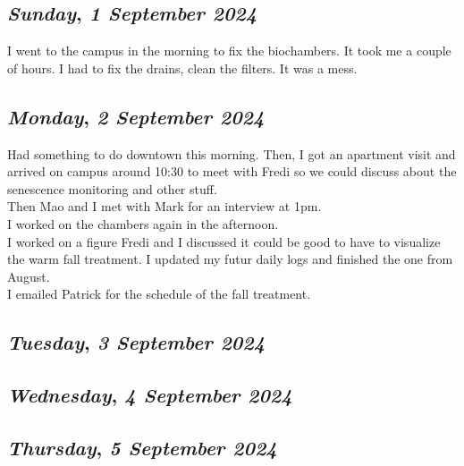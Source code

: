 \begin{center}
\section*{\month}
\end{center}

\def\day{\textit{1 September 2024}}
\def\weekday{\textit{Sunday}}
\subsection*{\weekday, \day}
I went to the campus in the morning to fix the biochambers. It took me a couple of hours. I had to fix the drains, clean the filters. It was a mess. 

\def\day{\textit{2 September 2024}}
\def\weekday{\textit{Monday}}
\subsection*{\weekday, \day}
Had something to do downtown this morning. Then, I got an apartment visit and arrived on campus around 10:30 to meet with Fredi so we could discuss about the senescence monitoring and other stuff. \\
Then Mao and I met with Mark for an interview at 1pm. \\
I worked on the chambers again in the afternoon.\\
I worked on a figure Fredi and I discussed it could be good to have to visualize the warm fall treatment. I updated my futur daily logs and finished the one from August. \\
I emailed Patrick for the schedule of the fall treatment. 

\def\day{\textit{3 September 2024}}
\def\weekday{\textit{Tuesday}}
\subsection*{\weekday, \day}

\def\day{\textit{4 September 2024}}
\def\weekday{\textit{Wednesday}}
\subsection*{\weekday, \day}

\def\day{\textit{5 September 2024}}
\def\weekday{\textit{Thursday}}
\subsection*{\weekday, \day}


